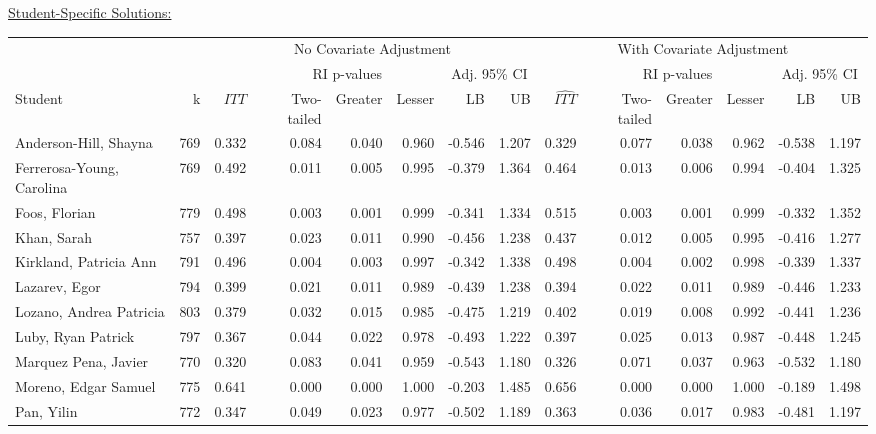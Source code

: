 \documentclass[11pt,notitlepage]{article}
\begin{document}
\underline{{\sc Student-Specific Solutions:}}

\begin{table}[h!]\scriptsize
\begin{center}
\begin{tabular}{lrrrrrrr|rrrrrr}
  \hline
  & & \multicolumn{6}{c|}{No Covariate Adjustment} & \multicolumn{6}{c}{With Covariate Adjustment} \\
  \cline{3-14}
  & & & \multicolumn{3}{c}{RI p-values} & \multicolumn{2}{c|}{Adj. 95\% CI} &  & \multicolumn{3}{c}{RI p-values} & \multicolumn{2}{c}{Adj. 95\% CI} \\
  \cline{4-6}\cline{10-12}
Student & k & $\widehat{ITT}$ & Two-tailed & Greater & Lesser & LB & UB & $\widehat{ITT}$ & Two-tailed & Greater & Lesser & LB & UB \\ 
  \hline
Anderson-Hill, Shayna & 769 & 0.332 & 0.084 & 0.040 & 0.960 & -0.546 & 1.207 & 0.329 & 0.077 & 0.038 & 0.962 & -0.538 & 1.197 \\ 
  Ferrerosa-Young, Carolina & 769 & 0.492 & 0.011 & 0.005 & 0.995 & -0.379 & 1.364 & 0.464 & 0.013 & 0.006 & 0.994 & -0.404 & 1.325 \\ 
  Foos, Florian & 779 & 0.498 & 0.003 & 0.001 & 0.999 & -0.341 & 1.334 & 0.515 & 0.003 & 0.001 & 0.999 & -0.332 & 1.352 \\ 
  Khan, Sarah & 757 & 0.397 & 0.023 & 0.011 & 0.990 & -0.456 & 1.238 & 0.437 & 0.012 & 0.005 & 0.995 & -0.416 & 1.277 \\ 
  Kirkland, Patricia Ann & 791 & 0.496 & 0.004 & 0.003 & 0.997 & -0.342 & 1.338 & 0.498 & 0.004 & 0.002 & 0.998 & -0.339 & 1.337 \\ 
  Lazarev, Egor & 794 & 0.399 & 0.021 & 0.011 & 0.989 & -0.439 & 1.238 & 0.394 & 0.022 & 0.011 & 0.989 & -0.446 & 1.233 \\ 
  Lozano, Andrea Patricia & 803 & 0.379 & 0.032 & 0.015 & 0.985 & -0.475 & 1.219 & 0.402 & 0.019 & 0.008 & 0.992 & -0.441 & 1.236 \\ 
  Luby, Ryan Patrick & 797 & 0.367 & 0.044 & 0.022 & 0.978 & -0.493 & 1.222 & 0.397 & 0.025 & 0.013 & 0.987 & -0.448 & 1.245 \\ 
  Marquez Pena, Javier & 770 & 0.320 & 0.083 & 0.041 & 0.959 & -0.543 & 1.180 & 0.326 & 0.071 & 0.037 & 0.963 & -0.532 & 1.180 \\ 
  Moreno, Edgar Samuel & 775 & 0.641 & 0.000 & 0.000 & 1.000 & -0.203 & 1.485 & 0.656 & 0.000 & 0.000 & 1.000 & -0.189 & 1.498 \\ 
  Pan, Yilin & 772 & 0.347 & 0.049 & 0.023 & 0.977 & -0.502 & 1.189 & 0.363 & 0.036 & 0.017 & 0.983 & -0.481 & 1.197 \\ 

\end{tabular}
\end{center}
\end{table}
\end{document}
